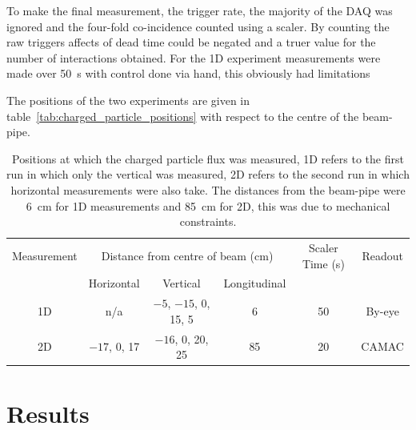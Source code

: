 To make the final measurement, the trigger rate, the majority of the DAQ was ignored and the four-fold co-incidence counted using a scaler. By counting the raw triggers affects of dead time could be negated and a truer value for the number of interactions obtained. For the 1D experiment measurements were made over 50~s with control done via hand, this obviously had limitations 

The positions of the two experiments are given in table~\ref{tab:charged_particle_positions} with respect to the centre of the beam-pipe.
\begin{table}
    \begin{center}
    \begin{tabular}{c|c|c|c|c|c}
        Measurement  &  \multicolumn{3}{c|}{Distance from centre of beam (cm)}         &  Scaler Time (s)  &  Readout \\
                     &    Horizontal    &       Vertical              &  Longitudinal  &                   &          \\
        \hline            
        1D           &  n/a             &  \(-5\), \(-15\), 0, 15, 5  &       6        &  50               & By-eye   \\
        2D           &  \(-17\), 0, 17  &  \(-16\), 0, 20, 25         &       85       &  20               & CAMAC    \\
    \end{tabular}
    \end{center}
    \caption{Positions at which the charged particle flux was measured, 1D refers to the first run in which only the vertical was measured, 2D refers to the second run in which horizontal measurements were also take. The distances from the beam-pipe were 6~cm for 1D measurements and 85~cm for 2D, this was due to mechanical constraints.}
    \label{tab:1d_res}
\end{table}

\section{Results} %
\label{sec:results}

